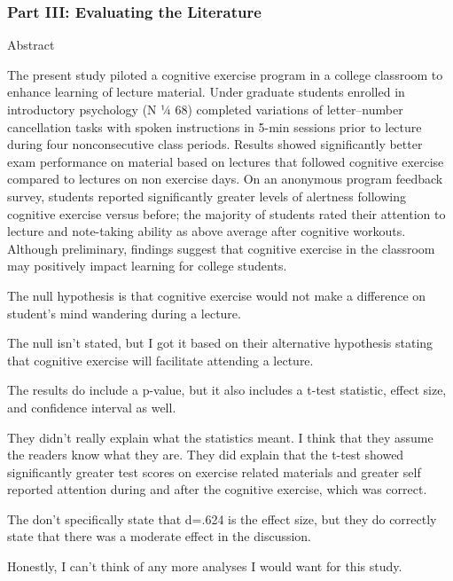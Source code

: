 \documentclass[
]{article}
\begin{document}
\hypertarget{part-iii-evaluating-the-literature}{%
\subsubsection{Part III: Evaluating the
Literature}\label{part-iii-evaluating-the-literature}}

Abstract

The present study piloted a cognitive exercise program in a college
classroom to enhance learning of lecture material. Undergraduate
students enrolled in introductory psychology (N ¼ 68) completed
variations of letter--number cancellation tasks with spoken instructions
in 5-min sessions prior to lecture during four nonconsecutive class
periods. Results showed significantly better exam performance on
material based on lectures that followed cognitive exercise compared to
lectures on non exercise days. On an anonymous program feedback survey,
students reported significantly greater levels of alertness following
cognitive exercise versus before; the majority of students rated their
attention to lecture and note-taking ability as above average after
cognitive workouts. Although preliminary, findings suggest that
cognitive exercise in the classroom may positively impact learning for
college students.

The null hypothesis is that cognitive exercise would not make a
difference on student's mind wandering during a lecture.

The null isn't stated, but I got it based on their alternative
hypothesis stating that cognitive exercise will facilitate attending a
lecture.

The results do include a p-value, but it also includes a t-test
statistic, effect size, and confidence interval as well.

They didn't really explain what the statistics meant. I think that they
assume the readers know what they are. They did explain that the t-test
showed significantly greater test scores on exercise related materials
and greater self reported attention during and after the cognitive
exercise, which was correct.

The don't specifically state that d=.624 is the effect size, but they do
correctly state that there was a moderate effect in the discussion.

Honestly, I can't think of any more analyses I would want for this
study.
\end{document}
